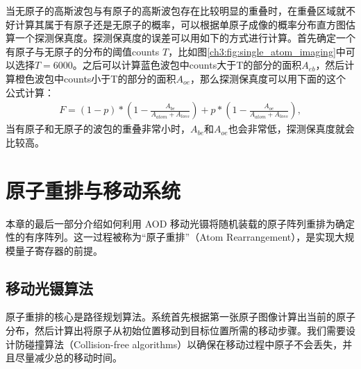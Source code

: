 \documentclass[../main.tex]{subfiles}
\begin{document}
当无原子的高斯波包与有原子的高斯波包存在比较明显的重叠时，在重叠区域就不好计算其属于有原子还是无原子的概率，可以根据单原子成像的概率分布直方图估算一个探测保真度。探测保真度的误差可以用如下的方式进行计算。首先确定一个有原子与无原子的分布的阈值counts $T$，比如图\ref{ch3:fig:single_atom_imaging}中可以选择$T=6000$。之后可以计算蓝色波包中counts大于T的部分的面积$A_{eb}$，然后计算橙色波包中counts小于T的部分的面积$A_{oe}$，那么探测保真度可以用下面的这个公式计算：
\begin{align}
F=(1-p)*(1-\frac{A_{be}}{A_{atom}+A_{loss}})+p*(1-\frac{A_{oe}}{A_{atom}+A_{loss}}),
\end{align}
当有原子和无原子的波包的重叠非常小时，$A_{be}$和$A_{oe}$也会非常低，探测保真度就会比较高。


\section{原子重排与移动系统}
\label{ch3:sec:atom_assembly}

本章的最后一部分介绍如何利用 AOD 移动光镊将随机装载的原子阵列重排为确定性的有序阵列。这一过程被称为“原子重排”（Atom Rearrangement），是实现大规模量子寄存器的前提。

\subsection{移动光镊算法}
\label{ch3:sec:assembly_algorithm}

原子重排的核心是路径规划算法。系统首先根据第一张原子图像计算出当前的原子分布，然后计算出将原子从初始位置移动到目标位置所需的移动步骤。我们需要设计防碰撞算法（Collision-free algorithms）以确保在移动过程中原子不会丢失，并且尽量减少总的移动时间。



\end{document}
